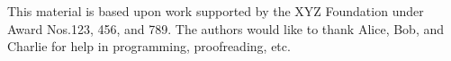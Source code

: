\begin{acks}
  This material is based upon work supported by the XYZ Foundation
  under Award Nos.\@ 123, 456, and 789. The authors would like to thank Alice,
  Bob, and Charlie for help in programming, proofreading, etc.
\end{acks}
